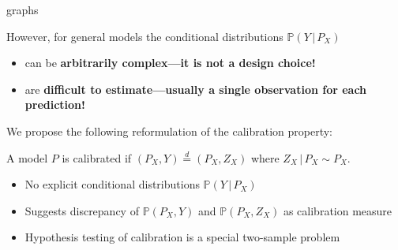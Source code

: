 \documentclass[10pt]{article}
\newcommand*{\Prob}{\mathbb{P}}
\newcommand{\hl}[1]{\begingroup\bfseries\boldmath\color{uured}#1\endgroup}
\begin{document}
\begin{tcbposter}
{\begin{tcbraster}[blankest, raster columns=3,raster equal height=rows, halign=flush center]
\begin{tcolorbox}
      \end{tcolorbox}
      \begin{tcolorbox}
        graphs\\[\baselineskip]
      \end{tcolorbox}
    \end{tcbraster}

    However, for general models the conditional distributions $\Prob(Y \,|\, P_X)$
    \begin{itemize}
    \item can be \hl{arbitrarily complex}---it is not a design choice!
    \item are \hl{difficult to estimate}---usually a single observation for each prediction!
    \end{itemize}


    We propose the following reformulation of the calibration property:

    \begin{tcolorbox}[colback=blondstark]
      A model $P$ is calibrated if $(P_X, Y) \stackrel{d}{=} (P_X, Z_X)$ where $Z_X \,|\, P_X \sim P_X$.
    \end{tcolorbox}

    \begin{itemize}
    \item No explicit conditional distributions $\Prob(Y \,|\, P_X)$
    \item Suggests discrepancy of $\Prob(P_X, Y)$ and $\Prob(P_X, Z_X)$
      as calibration measure
    \item Hypothesis testing of calibration is a special two-sample problem
    \end{itemize}
  }


\end{tcbposter}
\end{document}
